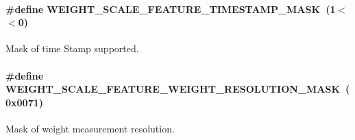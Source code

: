 \paragraph[{\texorpdfstring{W\+E\+I\+G\+H\+T\+\_\+\+S\+C\+A\+L\+E\+\_\+\+F\+E\+A\+T\+U\+R\+E\+\_\+\+T\+I\+M\+E\+S\+T\+A\+M\+P\+\_\+\+M\+A\+SK}{WEIGHT_SCALE_FEATURE_TIMESTAMP_MASK}}]{\setlength{\rightskip}{0pt plus 5cm}\#define W\+E\+I\+G\+H\+T\+\_\+\+S\+C\+A\+L\+E\+\_\+\+F\+E\+A\+T\+U\+R\+E\+\_\+\+T\+I\+M\+E\+S\+T\+A\+M\+P\+\_\+\+M\+A\+SK~(1$<$$<$0)}\hypertarget{group___w_e_i_g_h_t___s_c_a_l_e___f_e_a_t_u_r_e___m_a_s_k_gafb766535cad9337b79bcbeee44772560}{}\label{group___w_e_i_g_h_t___s_c_a_l_e___f_e_a_t_u_r_e___m_a_s_k_gafb766535cad9337b79bcbeee44772560}
Mask of time Stamp supported. 
\paragraph[{\texorpdfstring{W\+E\+I\+G\+H\+T\+\_\+\+S\+C\+A\+L\+E\+\_\+\+F\+E\+A\+T\+U\+R\+E\+\_\+\+W\+E\+I\+G\+H\+T\+\_\+\+R\+E\+S\+O\+L\+U\+T\+I\+O\+N\+\_\+\+M\+A\+SK}{WEIGHT_SCALE_FEATURE_WEIGHT_RESOLUTION_MASK}}]{\setlength{\rightskip}{0pt plus 5cm}\#define W\+E\+I\+G\+H\+T\+\_\+\+S\+C\+A\+L\+E\+\_\+\+F\+E\+A\+T\+U\+R\+E\+\_\+\+W\+E\+I\+G\+H\+T\+\_\+\+R\+E\+S\+O\+L\+U\+T\+I\+O\+N\+\_\+\+M\+A\+SK~(0x0071)}\hypertarget{group___w_e_i_g_h_t___s_c_a_l_e___f_e_a_t_u_r_e___m_a_s_k_ga6583718be6e93fe78379e48b460c1932}{}\label{group___w_e_i_g_h_t___s_c_a_l_e___f_e_a_t_u_r_e___m_a_s_k_ga6583718be6e93fe78379e48b460c1932}
Mask of weight measurement resolution. 